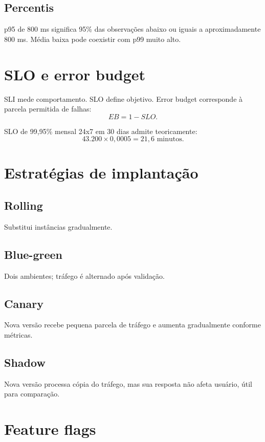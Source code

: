 \subsection{Percentis}

p95 de 800 ms significa 95\% das observações abaixo ou iguais a aproximadamente 800 ms. Média baixa pode coexistir com p99 muito alto.

\section{SLO e error budget}

SLI mede comportamento. SLO define objetivo. Error budget corresponde à parcela permitida de falhas:
\[
EB=1-SLO.
\]

SLO de 99,95\% mensal 24x7 em 30 dias admite teoricamente:
\[
43.200\times0{,}0005=21{,}6\text{ minutos}.
\]

\section{Estratégias de implantação}

\subsection{Rolling}

Substitui instâncias gradualmente.

\subsection{Blue-green}

Dois ambientes; tráfego é alternado após validação.

\subsection{Canary}

Nova versão recebe pequena parcela de tráfego e aumenta gradualmente conforme métricas.

\subsection{Shadow}

Nova versão processa cópia do tráfego, mas sua resposta não afeta usuário, útil para comparação.

\section{Feature flags}

